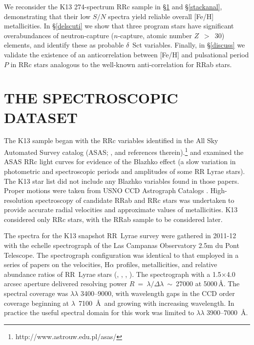 \documentclass[preprint]{aastex6}
\begin{document}
We reconsider the K13 274-spectrum RRc sample in \S\ref{spectra} and 
\S\ref{stackanal}, 
demonstrating that their low $S/N$ spectra yield reliable 
overall [Fe/H] metallicities.
In \S\ref{delscuti} we show that three program stars have significant 
overabundances of neutron-capture ($n$-capture, atomic number $Z$~$>$~30)
elements, and identify these as probable $\delta$~Sct variables.
Finally, in \S\ref{discuss} we 
validate the existence of an anticorrelation between 
[Fe/H] and pulsational period $P$ in RRc stars
analogous to the well-known anti-correlation for RRab stars.


\section{THE SPECTROSCOPIC DATASET}\label{spectra}

The K13 sample began with the RRc variables identified in the 
All Sky Automated Survey catalog (ASAS; \citealt{pojmanski02}, 
\citealt{pojmanski05} and references therein).\footnote{ 
http://www.astrouw.edu.pl/asas/}
\cite{szczygiel07} and \cite{szczygiel09} examined the ASAS RRc light
curves for evidence of the Blazhko effect (a slow variation in photometric and 
spectroscopic periods and amplitudes of some RR Lyrae stars).
The K13 star list did not include any Blazhko variables found in those papers.
Proper motions were taken from USNO CCD Astrograph Catalogs 
\citep{zacharias04,zacharias13}.
High-resolution spectroscopy of candidate RRab and RRc stars was undertaken
to provide accurate radial velocities and approximate values of metallicities.
K13 considered only RRc stars, with the RRab sample to be considered later.

The spectra for the K13 snapshot RR~Lyrae survey were gathered in 2011-12 
with the echelle spectrograph of the Las Campanas Observatory 2.5m du Pont 
Telescope.
The spectrograph configuration was identical to that employed in a series
of papers on the velocities, H$\alpha$ profiles, metallicities, and 
relative abundance ratios of RR~Lyrae stars (\citealt{for11a,for11b}, 
\citealt{govea14}, \citealt{chadid17}, \citealt{sneden17}).
The spectrograph with a 1.5$\times$4.0\,arcsec aperture delivered resolving power
$R$~=~$\lambda/\Delta\lambda$~$\sim$~27000 at 5000\,\AA.
The spectral coverage was $\lambda\lambda$ 3400--9000, with
wavelength gaps in the CCD order coverage beginning at $\lambda$~7100~\AA\
and growing with increasing wavelength.
In practice the useful spectral domain for this work was limited to 
$\lambda\lambda$ 3900--7000~\AA.
\end{document}
